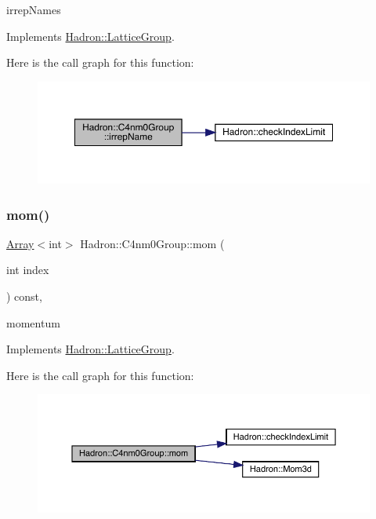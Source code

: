 irrep\+Names 

Implements \mbox{\hyperlink{structHadron_1_1LatticeGroup_a4bc5620218c2a73157e19bc4451fe746}{Hadron\+::\+Lattice\+Group}}.

Here is the call graph for this function\+:
\nopagebreak
\begin{figure}[H]
\begin{center}
\leavevmode
\includegraphics[width=350pt]{da/da1/structHadron_1_1C4nm0Group_ae7e7c420d17cacaed69a74902af72dcc_cgraph}
\end{center}
\end{figure}
\mbox{\label{structHadron_1_1C4nm0Group_a45599b94fa4633619247f4827e03ca23}} 
\subsubsection{\texorpdfstring{mom()}{mom()}\hspace{0.1cm}{\footnotesize\ttfamily [1/2]}}
{\footnotesize\ttfamily \mbox{\hyperlink{classXMLArray_1_1Array}{Array}}$<$int$>$ Hadron\+::\+C4nm0\+Group\+::mom (\begin{DoxyParamCaption}\item[{int}]{index }\end{DoxyParamCaption}) const\hspace{0.3cm}{\ttfamily [inline]}, {\ttfamily [virtual]}}

momentum 

Implements \mbox{\hyperlink{structHadron_1_1LatticeGroup_ad577b65041dd9a6e84b1f3bd49cb8fce}{Hadron\+::\+Lattice\+Group}}.

Here is the call graph for this function\+:
\nopagebreak
\begin{figure}[H]
\begin{center}
\leavevmode
\includegraphics[width=350pt]{da/da1/structHadron_1_1C4nm0Group_a45599b94fa4633619247f4827e03ca23_cgraph}
\end{center}
\end{figure}
\mbox{\label{structHadron_1_1C4nm0Group_a45599b94fa4633619247f4827e03ca23}} 
